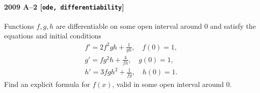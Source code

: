 \paragraph{2009 A--2 \textnormal{[\texttt{ode, differentiability}]}}
Functions $f,g,h$ are differentiable on some open interval around $0$
and satisfy the equations and initial conditions
\begin{gather*}
f' = 2f^2gh+\frac{1}{gh},\quad f(0)=1, \\
g'=fg^2h+\frac{4}{fh}, \quad g(0)=1, \\
h'=3fgh^2+\frac{1}{fg}, \quad h(0)=1.
\end{gather*}
Find an explicit formula for $f(x)$, valid in some open interval around $0$.
